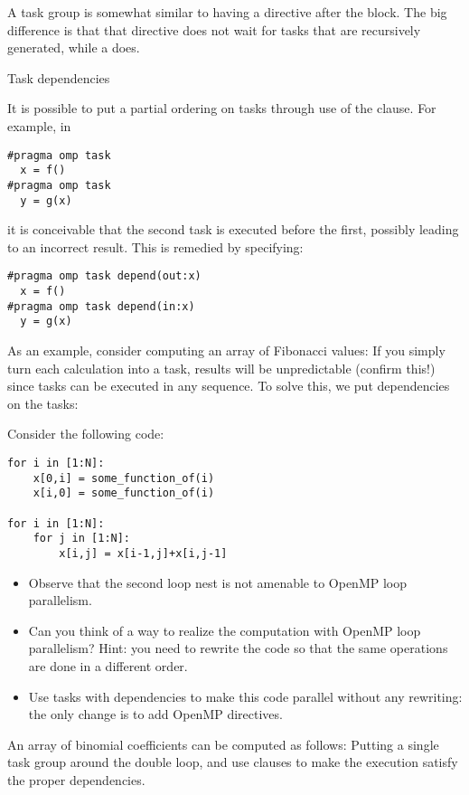 A task group is somewhat similar to having a 
directive after the block. The big difference is that that
 directive does not wait for tasks that are recursively
generated, while a  does.

 {Task dependencies}

It is possible to put a partial ordering on
tasks through use of the  clause. For example, in
\begin{verbatim}
#pragma omp task
  x = f()
#pragma omp task
  y = g(x)
\end{verbatim}
it is conceivable that the second task is executed before the first,
possibly leading to an incorrect result. This is remedied by specifying:
\begin{verbatim}
#pragma omp task depend(out:x)
  x = f()
#pragma omp task depend(in:x)
  y = g(x)
\end{verbatim}

As an example, consider computing an array of Fibonacci values:
%
%
If you simply turn each calculation into a task, results will be
unpredictable (confirm this!) since tasks can be executed in any sequence.
To solve this, we put dependencies on the tasks:
%

\begin{exercise}
Consider the following code:
\begin{verbatim}
for i in [1:N]:
    x[0,i] = some_function_of(i)
    x[i,0] = some_function_of(i)

for i in [1:N]:
    for j in [1:N]:
        x[i,j] = x[i-1,j]+x[i,j-1]
\end{verbatim}
\begin{itemize}
\item Observe that the second loop nest is not amenable to OpenMP loop
  parallelism.
\item Can you think of a way to realize the computation with OpenMP
  loop parallelism? Hint: you need to rewrite the code so that the
  same operations are done in a different order.
\item Use tasks with dependencies to make this code parallel without
  any rewriting: the only change is to add OpenMP directives.
\end{itemize}
\end{exercise}

\begin{exercise}
  An array of binomial coefficients can be computed as follows:
  Putting a single task group around the double loop, and use
   clauses to make the execution satisfy the proper dependencies.
\end{exercise}

